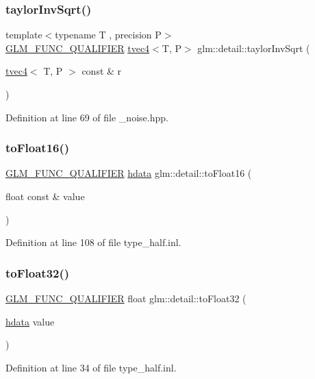 \subsubsection{\texorpdfstring{taylorInvSqrt()}{taylorInvSqrt()}\hspace{0.1cm}{\footnotesize\ttfamily [4/4]}}
{\footnotesize\ttfamily template$<$typename T , precision P$>$ \\
\mbox{\hyperlink{setup_8hpp_a33fdea6f91c5f834105f7415e2a64407}{G\+L\+M\+\_\+\+F\+U\+N\+C\+\_\+\+Q\+U\+A\+L\+I\+F\+I\+ER}} \mbox{\hyperlink{structglm_1_1tvec4}{tvec4}}$<$T, P$>$ glm\+::detail\+::taylor\+Inv\+Sqrt (\begin{DoxyParamCaption}\item[{\mbox{\hyperlink{structglm_1_1tvec4}{tvec4}}$<$ T, P $>$ const \&}]{r }\end{DoxyParamCaption})}



Definition at line 69 of file \+\_\+noise.\+hpp.

\mbox{\label{namespaceglm_1_1detail_ac16321696a34b41c55f941b319d50652}} 
\subsubsection{\texorpdfstring{toFloat16()}{toFloat16()}}
{\footnotesize\ttfamily \mbox{\hyperlink{setup_8hpp_a33fdea6f91c5f834105f7415e2a64407}{G\+L\+M\+\_\+\+F\+U\+N\+C\+\_\+\+Q\+U\+A\+L\+I\+F\+I\+ER}} \mbox{\hyperlink{namespaceglm_1_1detail_aa2115f7dd38e14fea7ba9e95104120f3}{hdata}} glm\+::detail\+::to\+Float16 (\begin{DoxyParamCaption}\item[{float const \&}]{value }\end{DoxyParamCaption})}



Definition at line 108 of file type\+\_\+half.\+inl.

\mbox{\label{namespaceglm_1_1detail_a8e4719d94d99ee1e625496e04317272b}} 
\subsubsection{\texorpdfstring{toFloat32()}{toFloat32()}}
{\footnotesize\ttfamily \mbox{\hyperlink{setup_8hpp_a33fdea6f91c5f834105f7415e2a64407}{G\+L\+M\+\_\+\+F\+U\+N\+C\+\_\+\+Q\+U\+A\+L\+I\+F\+I\+ER}} float glm\+::detail\+::to\+Float32 (\begin{DoxyParamCaption}\item[{\mbox{\hyperlink{namespaceglm_1_1detail_aa2115f7dd38e14fea7ba9e95104120f3}{hdata}}}]{value }\end{DoxyParamCaption})}



Definition at line 34 of file type\+\_\+half.\+inl.

